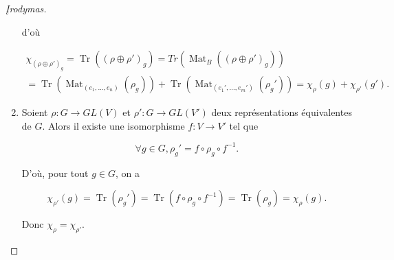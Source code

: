 \documentclass[french]{book}
\theoremstyle{definition}
\begin{document}
\begin{proof}[\k{I}rodymas]
\begin{enumerate}
      d'où

      \begin{gather*}
        \chi _{(\rho\oplus \rho')_g} = \operatorname{Tr}((\rho\oplus \rho')_g) = Tr(\operatorname{Mat}_B((\rho \oplus \rho')_g))\\
         = \operatorname{Tr}(\operatorname{Mat} _{(e_1, \dots, e_n)}(\rho_g))+ \operatorname{Tr}(\operatorname{Mat} _{(e_1', \dots, e_m')}(\rho_g')) = \chi _{\rho}(g) + \chi _{\rho'}(g').
      \end{gather*}

      \item Soient \(\rho : G \longrightarrow GL(V)\) et \(\rho' : G \longrightarrow GL(V')\) deux représentations équivalentes de \(G\). Alors il existe une isomorphisme \(f : V \longrightarrow V'\) tel que

      \[\forall g \in G, \rho_g' = f \circ \rho_g \circ f ^{-1}.\]

      D'où, pour tout \(g \in G\), on a

      \[\chi _{\rho'}(g) = \operatorname{Tr}(\rho_g') = \operatorname{Tr}(f \circ \rho_g \circ f ^{-1}) = \operatorname{Tr}(\rho_g) = \chi _{\rho}(g).\]

      Donc \(\chi _{\rho} = \chi _{\rho'}\).
  \end{enumerate}
\end{proof}

\end{document}
